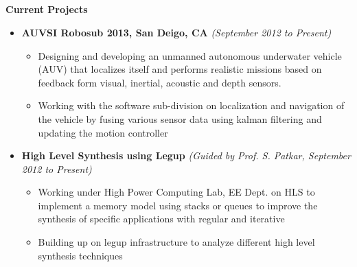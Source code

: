 \documentclass[a4paper,10pt]{article}
\newcommand{\isep}{-2 pt}
\newcommand{\resheading}[1]{{\small \colorbox{mygrey}{\begin{minipage}{0.975\textwidth}{\textbf{#1 \vphantom{p\^{E}}}}\end{minipage}}}}
\begin{document}
\hspace{0.5cm}\\
\hspace{0.5cm}\\
\hspace{0.5cm}\\
\hspace{0.5cm}\\
\hspace{0.5cm}\\
\hspace{0.5cm}\\ 
\hspace{0.5cm}\\
\hspace{0.5cm}\\
\hspace{0.5cm}\\[-0.2cm]


\resheading{\textbf{\large{Current Projects}}}
\begin{itemize}
    \item \textbf{AUVSI Robosub 2013, San Deigo, CA} \hfill \emph{(September 2012 to Present) } \\[-0.6cm]
    \begin{itemize} \itemsep \isep
        \item Designing and developing an unmanned autonomous underwater vehicle (AUV) that localizes itself and performs realistic missions based on feedback form visual, inertial, acoustic and depth sensors. 
        \item Working with the software sub-division on localization and navigation of the vehicle  by fusing various sensor data using kalman filtering and updating the motion controller \\[-0.6cm]
    \end{itemize}
    \item \textbf{ High Level Synthesis using Legup} \hfill \emph{(Guided by Prof. S. Patkar, September 2012 to Present) }  \\[-0.6cm]
    \begin{itemize} \itemsep \isep 
        \item Working under High Power Computing Lab, EE Dept. on HLS to implement a memory model using stacks or queues to improve the synthesis of specific applications with regular and iterative 
        \item Building up on legup infrastructure to analyze different high level synthesis techniques
        \end{itemize}
\end{itemize}
\end{document}
